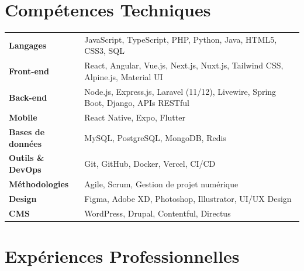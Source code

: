 \documentclass[a4paper,11pt]{article}
\begin{document}
\section{ Compétences Techniques}

\begin{tabularx}{\textwidth}{@{}>{	\bfseries\color{primary}}l@{\hspace{8pt}}X@{}}
    Langages & JavaScript, TypeScript, PHP, Python, Java, HTML5, CSS3, SQL \\[3pt]
    Front-end & React, Angular, Vue.js, Next.js, Nuxt.js, Tailwind CSS, Alpine.js, Material UI \\[3pt]
    Back-end & Node.js, Express.js, Laravel (11/12), Livewire, Spring Boot, Django, APIs RESTful \\[3pt]
    Mobile & React Native, Expo, Flutter \\[3pt]
    Bases de données & MySQL, PostgreSQL, MongoDB, Redis \\[3pt]
    Outils \& DevOps & Git, GitHub, Docker, Vercel, CI/CD \\[3pt]
    Méthodologies & Agile, Scrum, Gestion de projet numérique \\[3pt]
    Design & Figma, Adobe XD, Photoshop, Illustrator, UI/UX Design \\[3pt]
    CMS & WordPress, Drupal, Contentful, Directus \\
\end{tabularx}

\section{ Expériences Professionnelles}
\end{document}
